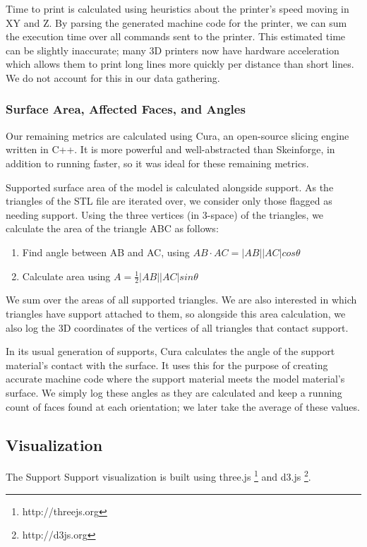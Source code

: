 \documentclass{sigchi}
\begin{document}
Time to print is calculated using heuristics about the printer's speed moving in XY and Z.  By parsing the generated machine code for the printer, we can sum the execution time over all commands sent to the printer.  This estimated time can be slightly inaccurate; many 3D printers now have hardware acceleration which allows them to print long lines more quickly per distance than short lines. We do not account for this in our data gathering.

\subsubsection{Surface Area, Affected Faces, and Angles}
Our remaining metrics are calculated using Cura, an open-source slicing engine written in C++.  It is more powerful and well-abstracted than Skeinforge, in addition to running faster, so it was ideal for these remaining metrics.

Supported surface area of the model is calculated alongside support.  As the triangles of the STL file are iterated over, we consider only those flagged as needing support.  Using the three vertices (in 3-space) of the triangles, we calculate the area of the triangle ABC as follows:

\begin{enumerate}
\item Find angle between AB and AC, using $AB \cdot AC = |AB||AC|cos\theta$
\item Calculate area using $A = \frac{1}{2}|AB||AC|sin\theta$
\end{enumerate}

We sum over the areas of all supported triangles.  We are also interested in which triangles have support attached to them, so alongside this area calculation, we also log the 3D coordinates of the vertices of all triangles that contact support.

In its usual generation of supports, Cura calculates the angle of the support material's contact with the surface.  It uses this for the purpose of creating accurate machine code where the support material meets the model material's surface.  We simply log these angles as they are calculated and keep a running count of faces found at each orientation; we later take the average of these values.

\subsection{Visualization}
The Support Support visualization is built using three.js \footnote{http://threejs.org} and d3.js \footnote{http://d3js.org}.
\end{document}
